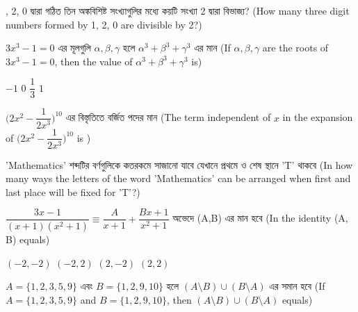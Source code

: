 \documentclass[addpoints]{exam}
\begin{document}
\begin{questions}
, 2, 0  দ্বারা গঠিত তিন অঙ্কবিশিষ্ট সংখ্যাগুলির মধ্যে কয়টি সংখ্যা 2 দ্বারা বিভাজ্য? (How many three digit numbers formed by 1, 2, 0 are divisible by 2?)

\begin{oneparchoices}

\end{oneparchoices}

\question   $ 3x^3 -1=0 $  এর মূলগুলি $ \alpha, \beta, \gamma $ হলে $ \alpha^{3} + \beta^{3} + \gamma^{3} $ এর মান (If $ \alpha, \beta, \gamma $ are the roots of $ 3x^3 -1=0 $, then the value of $ \alpha^{3} + \beta^{3} + \gamma^{3} $ is)

\begin{oneparchoices}
\choice $ -1 $
\choice $ 0 $
\choice $ \dfrac{1}{3} $
\choice  $ 1 $

\end{oneparchoices}

\question   $ \Bigg( 2x^2 -\dfrac{1}{2x^3}\Bigg)^{10} $   এর বিস্তৃতিতে বর্জিত পদের মান (The term independent of $ x $ in the expansion of $ \Bigg( 2x^2 -\dfrac{1}{2x^3}\Bigg)^{10} $ is )

\begin{oneparchoices}

\end{oneparchoices}

\question    'Mathematics' শব্দটির বর্ণগুলিকে কতরকমে সাজানো যাবে যেখানে প্রথমে ও শেষ স্থানে 'T' থাকবে (In how many ways the letters of the word 'Mathematics' can be arranged when first and last place will be fixed for 'T'?)

\begin{oneparchoices}

\end{oneparchoices}

\question  $ \dfrac{3x-1}{(x+1)(x^2 +1)} \equiv \dfrac{A}{x+1} + \dfrac{Bx+1}{x^2 +1} $  অভেদে (A,B) এর মান হবে (In the identity (A, B) equals)

\begin{oneparchoices}
\choice $ (-2,-2) $
\choice $ (-2, 2) $
\choice $ (2,-2) $
\choice  $ (2,2) $

\end{oneparchoices}

\question    $ A= \{1,2,3,5,9\} $ এবং $ B= \{1,2,9, 10\} $ হলে $ (A\setminus B)\cup (B\setminus A) $ এর সমান হবে (If $ A= \{1,2,3,5,9\} $ and $ B= \{1,2,9, 10\} $, then $ (A\setminus B)\cup (B\setminus A) $ equals)


\end{questions}
\end{document}
